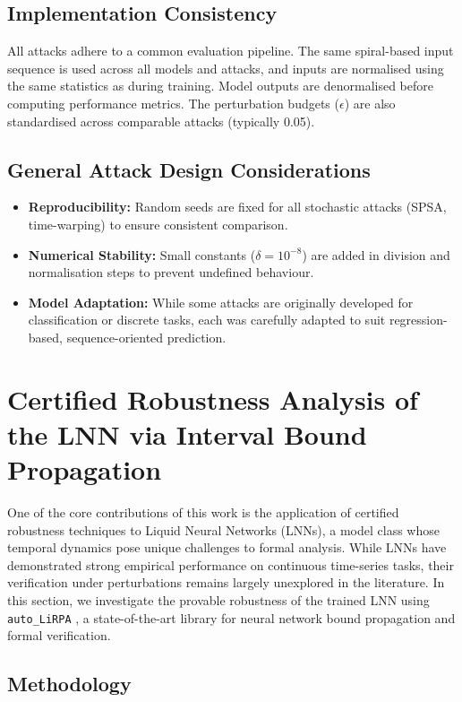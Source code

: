 \subsection*{Implementation Consistency}
All attacks adhere to a common evaluation pipeline.
The same spiral-based input sequence is used across all models and attacks, and inputs are normalised using the same statistics as during training. Model outputs are denormalised before computing performance metrics. The perturbation budgets ($\epsilon$) are also standardised across comparable attacks (typically 0.05).

\subsection*{General Attack Design Considerations}
\begin{itemize}
    \item \textbf{Reproducibility:} Random seeds are fixed for all stochastic attacks (SPSA, time-warping) to ensure consistent comparison.
    \item \textbf{Numerical Stability:} Small constants ($\delta = 10^{-8}$) are added in division and normalisation steps to prevent undefined behaviour.
    \item \textbf{Model Adaptation:} While some attacks are originally developed for classification or discrete tasks, each was carefully adapted to suit regression-based, sequence-oriented prediction.
\end{itemize}

\section{Certified Robustness Analysis of the LNN via Interval Bound Propagation}

One of the core contributions of this work is the application of certified robustness techniques to Liquid Neural Networks (LNNs), a model class whose temporal dynamics pose unique challenges to formal analysis. While LNNs have demonstrated strong empirical performance on continuous time-series tasks, their verification under perturbations remains largely unexplored in the literature. In this section, we investigate the provable robustness of the trained LNN using \texttt{auto\_LiRPA} \cite{autoLiRPA2022}, a state-of-the-art library for neural network bound propagation and formal verification.

\subsection*{Methodology}

